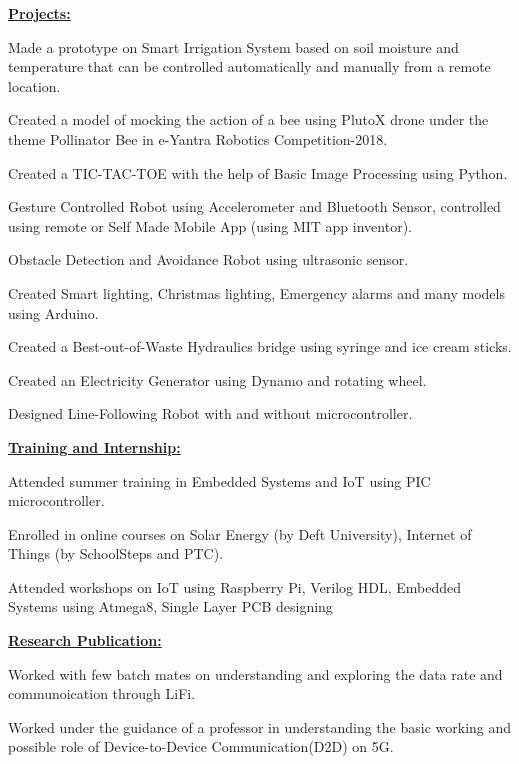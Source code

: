 \documentclass[12pt]{report}
\begin{document}
{\vspace{80pt}
\textbf{\large{\underline{Projects:}}}
\begin{enumerate}
	\large{\item Made a prototype on Smart Irrigation System based on soil moisture and temperature that can be controlled automatically and manually from a remote location.}
	\item Created a model of mocking the action of a bee using PlutoX drone under the theme Pollinator Bee in e-Yantra Robotics Competition-2018.
	\item 	Created a TIC-TAC-TOE with the help of Basic Image Processing using Python.
	\item Gesture Controlled Robot using Accelerometer and Bluetooth Sensor, controlled using remote or Self Made Mobile App (using MIT app inventor).
	\item	Obstacle Detection and Avoidance Robot using ultrasonic sensor. 
	\item Created Smart lighting, Christmas lighting, Emergency alarms and many models using Arduino.
	\item Created a Best-out-of-Waste Hydraulics bridge using syringe and ice cream sticks.
	\item Created an Electricity Generator using Dynamo and rotating wheel.
	\item Designed Line-Following Robot with and without microcontroller.
\end{enumerate}


\vspace{15pt}
\textbf{\large{\underline{Training and Internship:}}}
\begin{itemize}
		\large{\item Attended summer training in Embedded Systems and IoT using PIC microcontroller. }
	\item Enrolled in online courses on Solar Energy (by Deft University), Internet of Things (by SchoolSteps and PTC).
	\item Attended workshops on IoT using Raspberry Pi, Verilog HDL, Embedded Systems using Atmega8, Single Layer PCB designing 
\end{itemize}

\vspace{15pt}
\textbf{\large{\underline{Research Publication:}}}
\begin{enumerate}
	\large{\item Worked with few batch mates on understanding and exploring the data rate and communoication through LiFi.}
	\item Worked under the guidance of a professor in understanding the basic working and possible role of Device-to-Device Communication(D2D) on 5G.
\end{enumerate}


}
\end{document}
